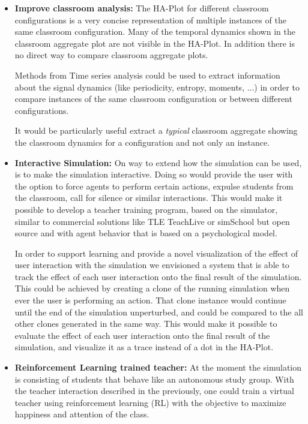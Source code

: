 \begin{itemize}
    \item \textbf{Improve classroom analysis:}
    The HA-Plot for different classroom configurations is a very concise representation
    of multiple instances of the same classroom configuration. Many of the temporal
    dynamics shown in the classroom aggregate plot are not visible in the HA-Plot.
    In addition there is no direct way to compare classroom aggregate plots.

    \bb

    Methods from Time series analysis could be used to extract information about
    the signal dynamics (like periodicity, entropy, moments, ...) in order to compare
    instances of the same classroom configuration or between different configurations.

    \bb

    It would be particularly useful extract a \textit{typical} classroom aggregate
    showing the classroom dynamics for a configuration and not only an instance.
    \item \textbf{Interactive Simulation:} 
    On way to extend how the simulation can be used, is to make the simulation
    interactive. Doing so would provide the user with the option to force agents
    to perform certain actions, expulse students from the classroom, call for silence
    or similar interactions. This would make it possible to develop a teacher training 
    program, based on the simulator, similar to commercial solutions like TLE TeachLive
    \cite{Dieker2017} or simSchool \cite{Badiee2015} but open source and with
    agent behavior that is based on a psychological model.
    
    \bb
    
    In order to support learning and provide a novel visualization of the effect
    of user interaction with the simulation we envisioned a system that is able to track
    the effect of each user interaction onto the final result of the simulation.
    This could be achieved by creating a clone of the running simulation when ever
    the user is performing an action. That clone instance would continue until the 
    end of the simulation unperturbed, and could be compared to the all other clones
    generated in the same way. This would make it possible to evaluate the effect
    of each user interaction onto the final result of the simulation, and visualize it
    as a trace instead of a dot in the HA-Plot.

    \item \textbf{Reinforcement Learning trained teacher:} At the moment the simulation
    is consisting of students that behave like an autonomous study group.
    With the teacher interaction described in the previously, one could train a
    virtual teacher using reinforcement learning (RL) with
    the objective to maximize happiness and attention of the class.
    

\end{itemize}
